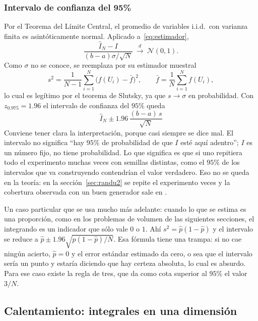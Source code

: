 \documentclass[11pt,letterpaper]{article}
\begin{document}
\subsubsection{Intervalo de confianza del 95\%}

Por el Teorema del Límite Central, el promedio de variables i.i.d.\ con
varianza finita es asintóticamente normal. Aplicado a~\eqref{eq:estimador},
\begin{equation}
\frac{\hat{I}_N - I}{(b-a)\sigma/\sqrt{N}}
\ \xrightarrow{\ d\ }\ \mathcal{N}(0,1).
\end{equation}
Como $\sigma$ no se conoce, se reemplaza por su estimador muestral
\begin{equation}
s^2 = \frac{1}{N-1}\sum_{i=1}^{N}\big(f(U_i) - \bar{f}\big)^2,
\qquad \bar{f} = \frac{1}{N}\sum_{i=1}^N f(U_i),
\end{equation}
lo cual es legítimo por el teorema de Slutsky, ya que $s \to \sigma$ en
probabilidad. Con $z_{0.975} = 1.96$ el intervalo de confianza del $95\%$
queda
\begin{equation}
\boxed{\ \hat{I}_N \pm 1.96\,\frac{(b-a)\,s}{\sqrt{N}}\ }
\label{eq:ic}
\end{equation}
Conviene tener clara la interpretación, porque casi siempre se dice mal. El
intervalo no significa ``hay $95\%$ de probabilidad de que $I$ esté aquí
adentro''; $I$ es un número fijo, no tiene probabilidad. Lo que significa es
que si uno repitiera todo el experimento muchas veces con semillas distintas,
como el $95\%$ de los intervalos que va construyendo contendrían el valor
verdadero. Eso no se queda en la teoría: en la sección~\ref{sec:randu2} se
repite el experimento \KRandu{} veces y la cobertura observada con un buen
generador sale en \CoberturaMTOctante.

Un caso particular que se usa mucho más adelante: cuando lo que se estima es
una proporción, como en los problemas de volumen de las siguientes secciones,
el integrando es un indicador que sólo vale $0$ o $1$. Ahí
$s^2 = \hat{p}(1-\hat{p})$ y el intervalo se reduce a
$\hat{p} \pm 1.96\sqrt{\hat{p}(1-\hat{p})/N}$. Esa fórmula tiene una
trampa: si no cae ningún acierto, $\hat{p} = 0$ y el error estándar estimado
da cero, o sea que el intervalo sería un punto y estaría diciendo que hay
certeza absoluta, lo cual es absurdo. Para ese caso existe la regla de tres,
que da como cota superior al $95\%$ el valor $3/N$.

\subsection{Calentamiento: integrales en una dimensión}
\end{document}
